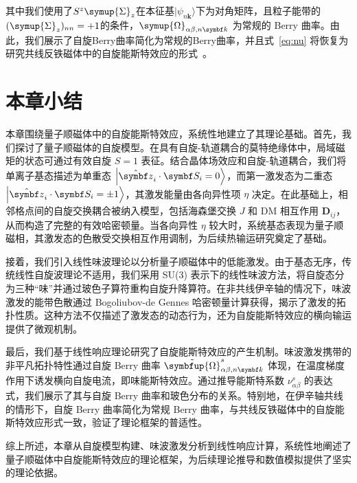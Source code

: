     其中我们使用了$S^z\symup{\Sigma}_z$在本征基$|\psi_{n{\bm{k}}}\rangle$下为对角矩阵，且粒子能带的$(\symup{\Sigma}_z)_{nn}=+1$的条件，$\symup{\Omega}_{\alpha \beta ,n{\bm{k}}}$ 为常规的 Berry 曲率。由此，我们展示了自旋Berry曲率简化为常规的Berry曲率，并且式~\eqref{eq:nu} 将恢复为研究共线反铁磁体中的自旋能斯特效应的形式~\cite{cheng2016spin,zyuzin2016Magnon}。

    \section{本章小结}
    本章围绕量子顺磁体中的自旋能斯特效应，系统性地建立了其理论基础。首先，我们探讨了量子顺磁体的自旋模型。在具有自旋-轨道耦合的莫特绝缘体中，局域磁矩的状态可通过有效自旋 $S=1$ 表征。结合晶体场效应和自旋-轨道耦合，我们将单离子基态描述为单重态 $\ket{\hat{\bm{z}}_i \cdot \bm{S}_i = 0}$，而第一激发态为二重态 $\ket{\hat{\bm{z}}_i \cdot \bm{S}_i = \pm 1}$，其激发能量由各向异性项 $\eta$ 决定。在此基础上，相邻格点间的自旋交换耦合被纳入模型，包括海森堡交换 $J$ 和 DM 相互作用 $\bm{D}_{ij}$，从而构造了完整的有效哈密顿量。当各向异性 $\eta$ 较大时，系统基态表现为量子顺磁相，其激发态的色散受交换相互作用调制，为后续热输运研究奠定了基础。

    接着，我们引入线性味波理论以分析量子顺磁体中的低能激发。由于基态无序，传统线性自旋波理论不适用，我们采用 SU(3) 表示下的线性味波方法，将自旋态分为三种“味”并通过玻色子算符重构自旋升降算符。在非共线伊辛轴的情况下，味波激发的能带色散通过 Bogoliubov-de Gennes 哈密顿量计算获得，揭示了激发的拓扑性质。这种方法不仅描述了激发态的动态行为，还为自旋能斯特效应的横向输运提供了微观机制。

    最后，我们基于线性响应理论研究了自旋能斯特效应的产生机制。味波激发携带的非平凡拓扑特性通过自旋 Berry 曲率 $\tilde{\symbfup{\Omega}}^s_{\alpha\beta,n\bm{k}}$ 体现，在温度梯度作用下诱发横向自旋电流，即味能斯特效应。通过推导能斯特系数 $\nu^s_{\alpha\beta}$ 的表达式，我们展示了其与自旋 Berry 曲率和玻色分布的关系。特别地，在伊辛轴共线的情形下，自旋 Berry 曲率简化为常规 Berry 曲率，与共线反铁磁体中的自旋能斯特效应形式一致，验证了理论框架的普适性。

    综上所述，本章从自旋模型构建、味波激发分析到线性响应计算，系统性地阐述了量子顺磁体中自旋能斯特效应的理论框架，为后续理论推导和数值模拟提供了坚实的理论依据。